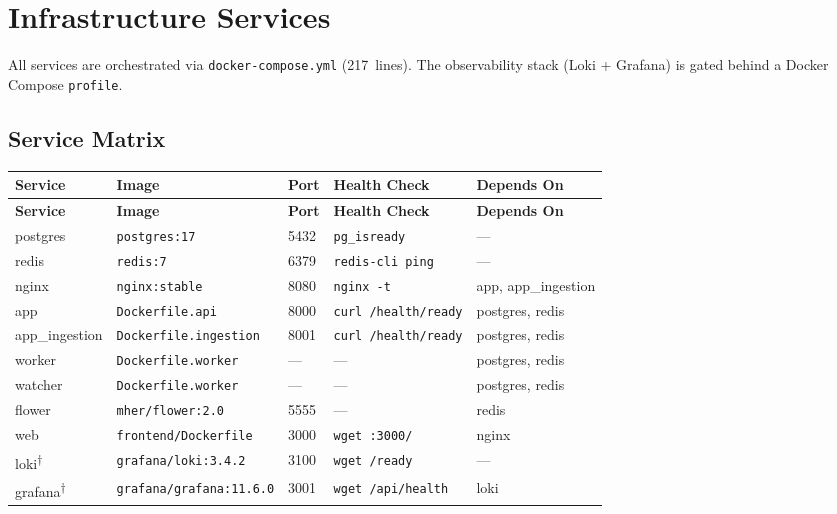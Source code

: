 
\section{Infrastructure Services}
\label{sec:infrastructure}

All services are orchestrated via \texttt{docker-compose.yml} (217~lines).
The observability stack (Loki + Grafana) is gated behind a Docker Compose
\texttt{profile}.

\subsection{Service Matrix}

\begin{longtable}{@{}lllll@{}}
\toprule
\textbf{Service} & \textbf{Image} & \textbf{Port} & \textbf{Health Check} & \textbf{Depends On} \\
\midrule
\endfirsthead
\toprule
\textbf{Service} & \textbf{Image} & \textbf{Port} & \textbf{Health Check} & \textbf{Depends On} \\
\midrule
\endhead
\bottomrule
\endfoot
postgres        & \texttt{postgres:17}             & 5432 & \texttt{pg\_isready}   & --- \\
redis           & \texttt{redis:7}                 & 6379 & \texttt{redis-cli ping}& --- \\
nginx           & \texttt{nginx:stable}            & 8080 & \texttt{nginx -t}      & app, app\_ingestion \\
app             & \texttt{Dockerfile.api}          & 8000 & \texttt{curl /health/ready} & postgres, redis \\
app\_ingestion  & \texttt{Dockerfile.ingestion}    & 8001 & \texttt{curl /health/ready} & postgres, redis \\
worker          & \texttt{Dockerfile.worker}       & ---  & ---                    & postgres, redis \\
watcher         & \texttt{Dockerfile.worker}       & ---  & ---                    & postgres, redis \\
flower          & \texttt{mher/flower:2.0}         & 5555 & ---                    & redis \\
web             & \texttt{frontend/Dockerfile}     & 3000 & \texttt{wget :3000/}   & nginx \\
loki\textsuperscript{$\dagger$}
                & \texttt{grafana/loki:3.4.2}      & 3100 & \texttt{wget /ready}   & --- \\
grafana\textsuperscript{$\dagger$}
                & \texttt{grafana/grafana:11.6.0}  & 3001 & \texttt{wget /api/health} & loki \\
\end{longtable}

